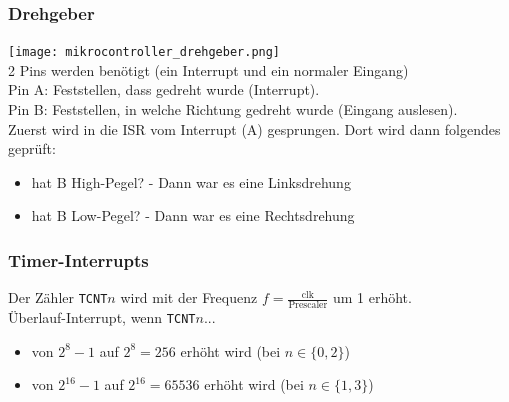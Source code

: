 \documentclass[german, threecolumn, 8pt]{latex4ei/latex4ei_sheet}
\begin{document}
\subsubsection{Drehgeber}
\texttt{[image: mikrocontroller\_drehgeber.png]}\\
2 Pins werden benötigt (ein Interrupt und ein normaler Eingang)\\
Pin A: Feststellen, dass gedreht wurde (Interrupt).\\
Pin B: Feststellen, in welche Richtung gedreht wurde (Eingang auslesen).\\
Zuerst wird in die ISR vom Interrupt (A) gesprungen. Dort wird dann folgendes geprüft:
\begin{itemize}
\item hat B High-Pegel? - Dann war es eine Linksdrehung
\item hat B Low-Pegel? - Dann war es eine Rechtsdrehung
\end{itemize}
\begin{minipage}{\columnwidth}
\subsubsection{Timer-Interrupts}
Der Zähler \texttt{TCNT$n$} wird mit der Frequenz $f=\frac{\text{clk}}{\text{Prescaler}}$ um 1 erhöht. \\
Überlauf-Interrupt, wenn \texttt{TCNT$n$}...
\begin{itemize}
\item von $2^8-1$ auf $2^8=256$ erhöht wird (bei $n\in \{0,2\}$)
\item von $2^{16}-1$ auf $2^{16}=65536$ erhöht wird (bei $n\in \{1,3\}$)
\end{itemize}
\end{minipage}

\newpage
{}

%

\label{LastPage}
\end{document}
